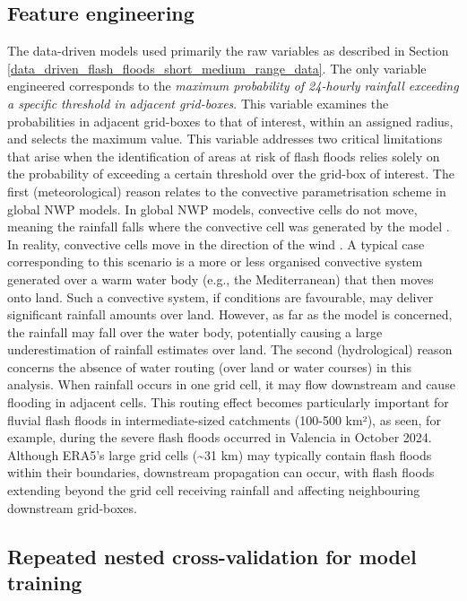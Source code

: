 \subsection{Feature engineering}
The data-driven models used primarily the raw variables as described in Section \ref{data_driven_flash_floods_short_medium_range_data}. The only variable engineered corresponds to the \textit{maximum probability of 24-hourly rainfall exceeding a specific threshold in adjacent grid-boxes}. This variable examines the probabilities in adjacent grid-boxes to that of interest, within an assigned radius, and selects the maximum value. This variable addresses two critical limitations that arise when the identification of areas at risk of flash floods relies solely on the probability of exceeding a certain threshold over the grid-box of interest. The first (meteorological) reason relates to the convective parametrisation scheme in global NWP models. In global NWP models, convective cells do not move, meaning the rainfall falls where the convective cell was generated by the model \citep{Doswell_2001}. In reality, convective cells move in the direction of the wind \citep{Doswell_2001}. A typical case corresponding to this scenario is a more or less organised convective system generated over a warm water body (e.g., the Mediterranean) that then moves onto land. Such a convective system, if conditions are favourable, may deliver significant rainfall amounts over land. However, as far as the model is concerned, the rainfall may fall over the water body, potentially causing a large underestimation of rainfall estimates over land. The second (hydrological) reason concerns the absence of water routing (over land or water courses) in this analysis. When rainfall occurs in one grid cell, it may flow downstream and cause flooding in adjacent cells. This routing effect becomes particularly important for fluvial flash floods in intermediate-sized catchments (100-500 km²), as seen, for example, during the severe flash floods occurred in Valencia in October 2024. Although ERA5's large grid cells (\sim31 km) may typically contain flash floods within their boundaries, downstream propagation can occur, with flash floods extending beyond the grid cell receiving rainfall and affecting neighbouring downstream grid-boxes.

\subsection{Repeated nested cross-validation for model training}

